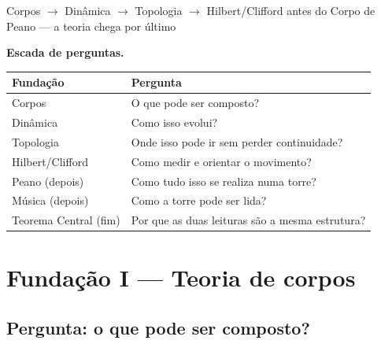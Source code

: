 \documentclass[11pt,a4paper]{article}
\newcommand{\code}[1]{\texttt{\small #1}}
\begin{document}
       {Corpos $\to$ Dinâmica $\to$ Topologia $\to$ Hilbert/Clifford}
       {antes do Corpo de Peano --- a teoria chega por último}
\maketitle

\begin{abstract}
\noindent Não se constrói um prédio pelo teto. Este documento é a
\textbf{torre abaixo}: quatro fundações, cada uma a responder a uma
pergunta que a torre precisa resolver. Só depois se entra no
\emph{Corpo de Peano} (\code{papers/corpo\_topologico.tex}), no Teorema
Central Gentil\,$\leftrightarrow$\,Hurwitz, na música e na histerese.
\[
\boxed{
\text{Corpos}
\;\to\;
\text{Dinâmica}
\;\to\;
\text{Topologia}
\;\to\;
\text{Hilbert/Clifford}
\;\to\;
\text{Corpo de Peano}
\;\to\;
\text{Teorema Central}.
}
\]
Não é um capítulo universitário genérico: é a escada até a
arquitectura aparecer como consequência.
\end{abstract}

\medskip
\noindent\textbf{Escada de perguntas.}
\begin{center}\small
\begin{tabular}{@{}lp{8.6cm}@{}}
\toprule
Fundação & Pergunta \\
\midrule
Corpos & O que pode ser composto? \\
Dinâmica & Como isso evolui? \\
Topologia & Onde isso pode ir sem perder continuidade? \\
Hilbert/Clifford & Como medir e orientar o movimento? \\
Peano (depois) & Como tudo isso se realiza numa torre? \\
Música (depois) & Como a torre pode ser lida? \\
Teorema Central (fim) & Por que as duas leituras são a mesma estrutura? \\
\bottomrule
\end{tabular}
\end{center}

\section{Fundação I --- Teoria de corpos}\label{sec:fund-corpos}
\subsection*{Pergunta: o que pode ser composto?}
\end{document}

